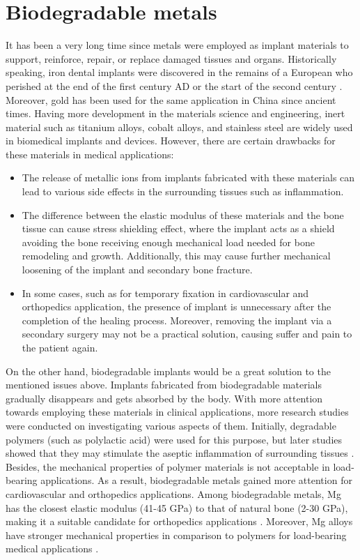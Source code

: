 \section{Biodegradable metals}

It has been a very long time since metals were employed as implant materials to support, reinforce, repair, or replace damaged tissues and organs. Historically speaking, iron dental implants were discovered in the remains of a European who perished at the end of the first century AD or the start of the second century \cite{Crubzy1998}. Moreover, gold has been used for the same application in China since ancient times. Having more development in the materials science and engineering, inert material such as titanium alloys, cobalt alloys, and stainless steel are widely used in biomedical implants and devices. However, there are certain drawbacks for these materials in medical applications:

\begin{itemize}
\item
The release of metallic ions from implants fabricated with these materials can lead to various side effects in the surrounding tissues such as inflammation.
\item
The difference between the elastic modulus of these materials and the bone tissue can cause stress shielding effect, where the implant acts as a shield avoiding the bone receiving enough mechanical load needed for bone remodeling and growth. Additionally, this may cause further mechanical loosening of the implant and secondary bone fracture.
\item
In some cases, such as for temporary fixation in cardiovascular and orthopedics application, the presence of implant is unnecessary after the completion of the healing process. Moreover, removing the implant via a secondary surgery may not be a practical solution, causing suffer and pain to the patient again.
\end{itemize}

On the other hand, biodegradable implants would be a great solution to the mentioned issues above. Implants fabricated from biodegradable materials gradually disappears and gets absorbed by the body. With more attention towards employing these materials in clinical applications, more research studies were conducted on investigating various aspects of them. Initially, degradable polymers (such as polylactic acid) were used for this purpose, but later studies showed that they may stimulate the aseptic inflammation of surrounding tissues \cite{Gao2022}. Besides, the mechanical properties of polymer materials is not acceptable in load-bearing applications. As a result, biodegradable metals gained more attention for cardiovascular and orthopedics applications. Among biodegradable metals, Mg has the closest elastic modulus (41-45 GPa) to that of natural bone (2-30 GPa), making it a suitable candidate for orthopedics applications \cite{Wang2020a}. Moreover, Mg alloys have stronger mechanical properties in comparison to polymers for load-bearing medical applications \cite{Han2019}.




